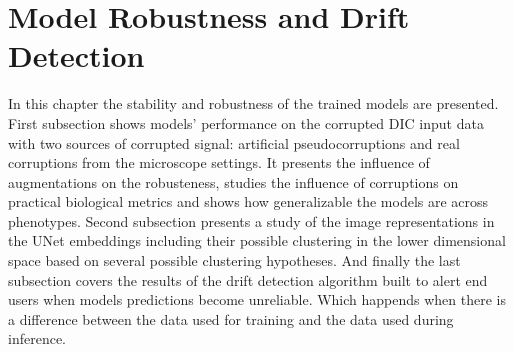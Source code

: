 \section{Model Robustness and Drift Detection}
    In this chapter the stability and robustness of the trained models are presented. First subsection shows models' performance on the corrupted DIC input data with two sources of corrupted signal: artificial pseudocorruptions and real corruptions from the microscope settings. It presents the influence of augmentations on the robusteness, studies the influence of corruptions on practical biological metrics and shows how generalizable the models are across phenotypes. Second subsection presents a study of the image representations in the UNet embeddings including their possible clustering in the lower dimensional space based on several possible clustering hypotheses. And finally the last subsection covers the results of the drift detection algorithm built to alert end users when models predictions become unreliable. Which happends when there is a difference between the data used for training and the data used during inference. 
    
    \pagebreak
    
    \pagebreak
    